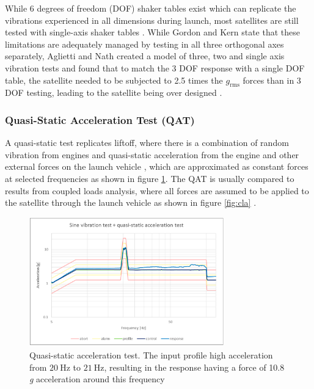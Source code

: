 \documentclass{report}
\begin{document}
While 6 degrees of freedom (DOF) shaker tables exist which can replicate the vibrations experienced in all dimensions during launch, most satellites are still tested with single-axis shaker tables \cite{gordon2015benefits,aglietti2019spacecraft,nath2022study}. While Gordon and Kern \cite{gordon2015benefits} state that these limitations are adequately managed by testing in all three orthogonal axes separately, Aglietti and Nath \cite{nath2022study} created a model of three, two and single axis vibration tests and found that to match the 3 DOF response with a single DOF table, the satellite needed to be subjected to 2.5 times the $g_\text{rms}$ forces than in 3 DOF testing, leading to the satellite being over designed \cite{nath2022study}.

\subsubsection{Quasi-Static Acceleration Test (QAT)}
A quasi-static test replicates liftoff, where there is a combination of random vibration from engines and quasi-static acceleration from the engine and other external forces on the launch vehicle \cite{nieto2019cubesat,brown_elements_2002}, which are approximated as constant forces at selected frequencies as shown in figure \ref{fig:qatforces}. The QAT is usually compared to results from coupled loads analysis, where all forces are assumed to be applied to the satellite through the launch vehicle as shown in figure \ref{fig:cla} \cite{dickens2001coupled}.

\begin{figure}[H]
  \centering
  \includegraphics[width=0.75\textwidth]{images/qat.png}
  \caption{Quasi-static acceleration test. The input profile high acceleration from $\SI{20}{\hertz}$ to $\SI{21}{\hertz}$, resulting in the response having a force of 10.8 \textit{g} acceleration around this frequency \cite{nieto2019cubesat}}
  \label{fig:qatforces}
\end{figure}
\end{document}
